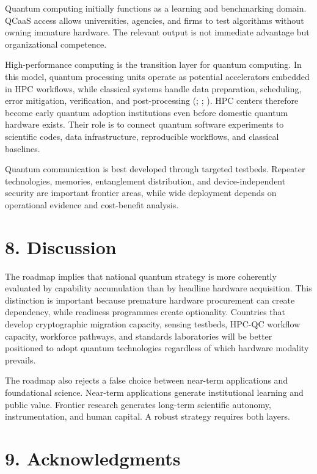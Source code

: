 \documentclass[
  11pt,
  letterpaper,
]{article}
\begin{document}
Quantum computing initially functions as a learning and benchmarking
domain. QCaaS access allows universities, agencies, and firms to test
algorithms without owning immature hardware. The relevant output is not
immediate advantage but organizational competence.

High-performance computing is the transition layer for quantum
computing. In this model, quantum processing units operate as potential
accelerators embedded in HPC workflows, while classical systems handle
data preparation, scheduling, error mitigation, verification, and
post-processing (;
; ). HPC centers therefore become early quantum adoption
institutions even before domestic quantum hardware exists. Their role is
to connect quantum software experiments to scientific codes, data
infrastructure, reproducible workflows, and classical baselines.

Quantum communication is best developed through targeted testbeds.
Repeater technologies, memories, entanglement distribution, and
device-independent security are important frontier areas, while wide
deployment depends on operational evidence and cost-benefit analysis.

\section{8. Discussion}\label{discussion}

The roadmap implies that national quantum strategy is more coherently
evaluated by capability accumulation than by headline hardware
acquisition. This distinction is important because premature hardware
procurement can create dependency, while readiness programmes create
optionality. Countries that develop cryptographic migration capacity,
sensing testbeds, HPC-QC workflow capacity, workforce pathways, and
standards laboratories will be better positioned to adopt quantum
technologies regardless of which hardware modality prevails.

The roadmap also rejects a false choice between near-term applications
and foundational science. Near-term applications generate institutional
learning and public value. Frontier research generates long-term
scientific autonomy, instrumentation, and human capital. A robust
strategy requires both layers.

\section{9. Acknowledgments}\label{acknowledgments}
\end{document}
